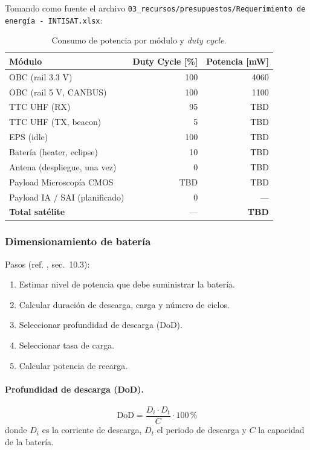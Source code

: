 Tomando como fuente el archivo
\texttt{03\_recursos/presupuestos/Requerimiento de energía - INTISAT.xlsx}:

\begin{table}[h]
\centering
\caption{Consumo de potencia por módulo y \textit{duty cycle}.}
\label{tab:power_consumption}
\begin{tabular}{lrr}
\toprule
\textbf{Módulo} & \textbf{Duty Cycle [\%]} & \textbf{Potencia [mW]} \\
\midrule
OBC (rail 3.3 V)               & 100  & 4060 \\
OBC (rail 5 V, CANBUS)         & 100  & 1100 \\
TTC UHF (RX)                   & 95   & TBD \\
TTC UHF (TX, beacon)           & 5    & TBD \\
EPS (idle)                     & 100  & TBD \\
Batería (heater, eclipse)      & 10   & TBD \\
Antena (despliegue, una vez)   & 0    & TBD \\
Payload Microscopía CMOS       & TBD  & TBD \\
Payload IA / SAI (planificado) & 0    & --- \\
\midrule
\textbf{Total satélite}        & ---  & \textbf{TBD} \\
\bottomrule
\end{tabular}
\end{table}

\subsubsection*{Dimensionamiento de batería}

Pasos (ref. \cite{Wertz2011}, sec.~10.3):
\begin{enumerate}
    \item Estimar nivel de potencia que debe suministrar la batería.
    \item Calcular duración de descarga, carga y número de ciclos.
    \item Seleccionar profundidad de descarga (DoD).
    \item Seleccionar tasa de carga.
    \item Calcular potencia de recarga.
\end{enumerate}

\paragraph{Profundidad de descarga (DoD).}
\begin{equation}
\mathrm{DoD} = \frac{D_i \cdot D_t}{C} \cdot 100\,\%
\label{eq:dod}
\end{equation}
donde $D_i$ es la corriente de descarga, $D_t$ el periodo de descarga y $C$ la capacidad de la batería.

